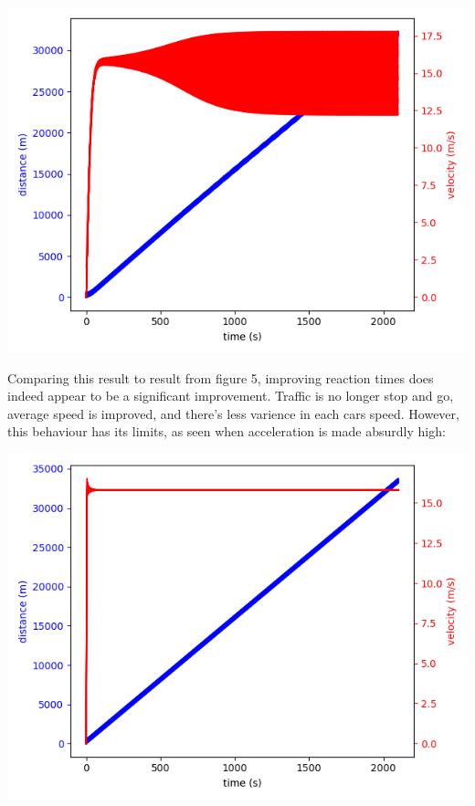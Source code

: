 \documentclass[11pt]{article}
\begin{document}
\begin{multicols}{2}
			\includegraphics[scale = 0.5]{Figure_6.png}

			\indent Comparing this result to result from figure 5, improving reaction times does indeed appear to be a significant improvement. Traffic is no longer stop and go, average speed is improved, and there's less varience in each
			cars speed. However, this behaviour has its limits, as seen when acceleration is made absurdly high:

			\includegraphics[scale = 0.5]{Figure_7.png}


\end{multicols}
\end{document}
